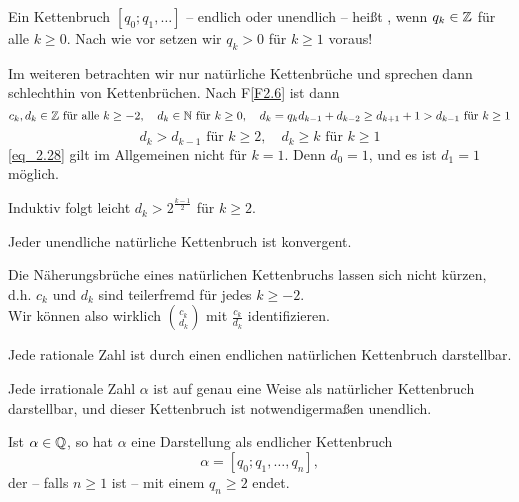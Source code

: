 \begin{defn}
	Ein Kettenbruch $[q_0;q_1,\dots]$ -- endlich oder unendlich -- heißt , wenn $q_k \in \mathbb{Z}$ für alle $k \geq 0$. Nach wie vor setzen wir $q_k > 0$ für $k \geq 1$ voraus!
\end{defn}

Im weiteren betrachten wir nur natürliche Kettenbrüche und sprechen dann schlechthin von Kettenbrüchen. Nach F\ref{F2.6} ist dann
\[ c_k, d_k \in \mathbb{Z} \text{ für alle } k \geq -2, \quad d_k \in \mathbb{N} \text{ für } k \geq 0, \quad d_k = q_kd_{k-1} + d_{k-2} \geq d_{k+1} + 1 > d_{k-1} \text{ für } k \geq 1 \]
\begin{equation}
	d_k > d_{k-1} \text{ für } k \geq 2, \quad d_k \geq k \text{ für } k \geq 1 \label{eq_2.28}
\end{equation} 
\eqref{eq_2.28} gilt im Allgemeinen nicht für $k = 1$. Denn $d_0 = 1$, und es ist $d_1 = 1$ möglich.

	Induktiv folgt leicht $d_k > 2^{\frac{k-1}{2}}$ für $k \geq 2$.
	
\begin{falko} \label{F2.12}
	Jeder unendliche natürliche Kettenbruch ist konvergent.
\end{falko}

\begin{falko} \label{F2.13}
	Die Näherungsbrüche eines natürlichen Kettenbruchs lassen sich nicht kürzen, d.h. $c_k$ und $d_k$ sind teilerfremd für jedes $k \geq -2$. \\
	Wir können also wirklich $\binom{c_k}{d_k}$ mit $\frac{c_k}{d_k}$ identifizieren.
\end{falko}

\begin{falko} \label{F2.14}
	Jede rationale Zahl ist durch einen endlichen natürlichen Kettenbruch darstellbar.
\end{falko}

\begin{falko} \label{F2.15}
	Jede irrationale Zahl $\alpha$ ist auf genau eine Weise als natürlicher Kettenbruch darstellbar, und dieser Kettenbruch ist notwendigermaßen unendlich.
\end{falko}

	Ist $\alpha \in \mathbb{Q}$, so hat $\alpha$ eine Darstellung als endlicher Kettenbruch
	\begin{equation}
		\alpha = [q_0;q_1, \dots, q_n], \label{eq_2.34}
	\end{equation}
	der -- falls $n \geq 1$ ist -- mit einem $q_n \geq 2$ endet.

